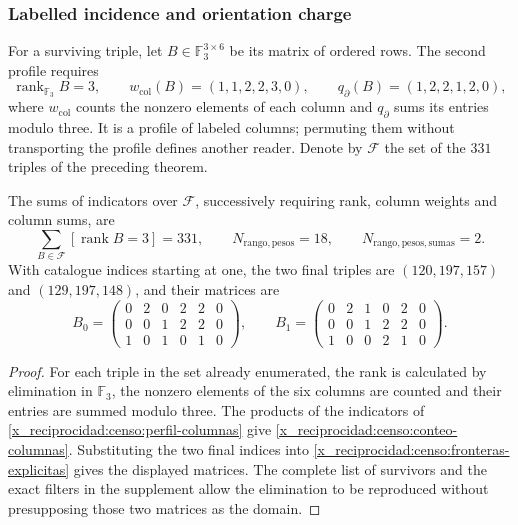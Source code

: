\subsubsection{Labelled incidence and orientation charge}

For a surviving triple, let \(B\in\mathbb F_3^{3\times6}\) be its
matrix of ordered rows. The second profile requires
\begin{equation}
 \operatorname{rank}_{\mathbb F_3}B=3,\qquad
 w_{\mathrm{col}}(B)=(1,1,2,2,3,0),\qquad
 q_{\partial}(B)=(1,2,2,1,2,0),
 \label{x_reciprocidad:censo:perfil-columnas}
\end{equation}
where \(w_{\mathrm{col}}\) counts the nonzero elements of each
column and \(q_{\partial}\) sums its entries modulo three. It is a profile
of labeled columns; permuting them without transporting the profile defines another
reader. Denote by \(\mathcal F\) the set of the \(331\) triples
of the preceding theorem.

\begin{proposition}
\label{x_reciprocidad:censo:dos-matrices}
The sums of indicators over \(\mathcal F\), successively requiring
rank, column weights and column sums, are
\begin{equation}
 \sum_{B\in\mathcal F}[\operatorname{rank}B=3]=331,
 \qquad N_{\mathrm{rango,pesos}}=18,
 \qquad N_{\mathrm{rango,pesos,sumas}}=2.
 \label{x_reciprocidad:censo:conteo-columnas}
\end{equation}
With catalogue indices starting at one, the two final triples are
\((120,197,157)\) and \((129,197,148)\), and their matrices are
\[
 B_0=\begin{pmatrix}0&2&0&2&2&0\\0&0&1&2&2&0\\1&0&1&0&1&0\end{pmatrix},
 \qquad
 B_1=\begin{pmatrix}0&2&1&0&2&0\\0&0&1&2&2&0\\1&0&0&2&1&0\end{pmatrix}.
\]
\end{proposition}
\begin{proof}
For each triple in the set already enumerated, the rank is calculated by elimination
in \(\mathbb F_3\), the nonzero elements of the six
columns are counted and their entries are summed modulo three. The products of the indicators
of \eqref{x_reciprocidad:censo:perfil-columnas} give \eqref{x_reciprocidad:censo:conteo-columnas}.
Substituting the two final indices into
\eqref{x_reciprocidad:censo:fronteras-explicitas} gives the displayed matrices. The complete
list of survivors and the exact filters in the supplement allow
the elimination to be reproduced without presupposing those two matrices as the domain.
\end{proof}

